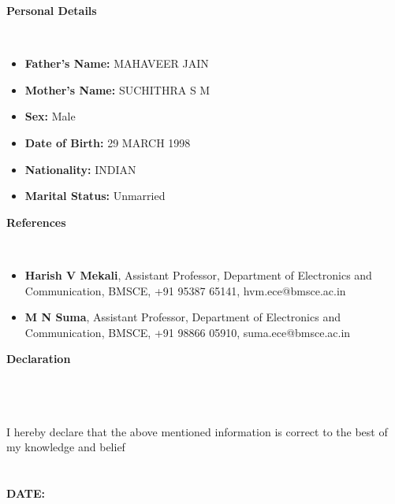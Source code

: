 \documentclass[a4paper,10pt]{article}
\newcommand{\lsep}{-0.5cm}
\newcommand{\resheading}[1]{{\small \colorbox{mygrey}{\begin{minipage}{0.975\textwidth}{\textbf{#1 \vphantom{p\^{E}}}}\end{minipage}}}}
\begin{document}
\resheading{\textbf{Personal Details} }\\[\lsep]
\begin{itemize}
\item \noindent \textbf{Father's Name:} MAHAVEER JAIN
\item \noindent \textbf{Mother's Name:} SUCHITHRA S M
\item \noindent \textbf{Sex:} Male
\item \noindent \textbf{Date of Birth:} 29 MARCH 1998
\item \noindent \textbf{Nationality:} INDIAN
\item \noindent \textbf{Marital Status:} Unmarried
\end{itemize}

\resheading{\textbf{References} }\\[\lsep]
\begin{itemize}
\item\noindent\textbf{Harish V Mekali}, Assistant Professor, Department of Electronics and Communication, BMSCE, +91 95387 65141, hvm.ece@bmsce.ac.in
\item\noindent\textbf{M N Suma}, Assistant Professor, Department of Electronics and Communication, BMSCE, +91 98866 05910, suma.ece@bmsce.ac.in
\end{itemize}

\resheading{\textbf{Declaration} }\\[\lsep]\\\\
\indent I hereby declare that the above mentioned information is correct to the best of my knowledge and belief\\\\\\
\indent\textbf{DATE:} \@date
\end{document}
